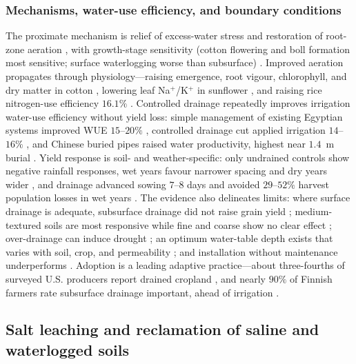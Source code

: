\subsubsection{Mechanisms, water-use efficiency, and boundary conditions}

The proximate mechanism is relief of excess-water stress and restoration of
root-zone aeration \parencite{BENNETT1982,DarziNaftchali2014}, with growth-stage
sensitivity (cotton flowering and boll formation most sensitive; surface
waterlogging worse than subsurface) \parencite{Qian2021}. Improved aeration
propagates through physiology---raising emergence, root vigour, chlorophyll, and
dry matter in cotton \parencite{Yang2022}, lowering leaf Na$^+$/K$^+$ in
sunflower \parencite{Islam2022}, and raising rice nitrogen-use efficiency
$16.1\%$ \parencite{DarziNaftchali2022b}. Controlled drainage repeatedly
improves irrigation water-use efficiency without yield loss: simple management
of existing Egyptian systems improved WUE $15$--$20\%$ \parencite{Wahba2005},
controlled drainage cut applied irrigation $14$--$16\%$ \parencite{Mahmoud2021},
and Chinese buried pipes raised water productivity, highest near $1.4$~m burial
\parencite{Liu2025}. Yield response is soil- and weather-specific: only
undrained controls show negative rainfall responses, wet years favour narrower
spacing and dry years wider \parencite{Rui2024,Kladivko2005,Acharya2019}, and
drainage advanced sowing $7$--$8$ days and avoided $29$--$52\%$ harvest
population losses in wet years \parencite{Mourtzinis2021,Nelson2011}. The
evidence also delineates limits: where surface drainage is adequate, subsurface
drainage did not raise grain yield \parencite{Wiersma2010}; medium-textured
soils are most responsive while fine and coarse show no clear effect
\parencite{Singh2022b}; over-drainage can induce drought
\parencite{Cordeiro2015,DeBoer2006}; an optimum water-table depth exists that
varies with soil, crop, and permeability \parencite{HOOGHOUDT1952,Bigelow2001};
and installation without maintenance underperforms \parencite{Malota2016}.
Adoption is a leading adaptive practice---about three-fourths of surveyed U.S.
producers report drained cropland \parencite{Morton2015}, and nearly $90\%$ of
Finnish farmers rate subsurface drainage important, ahead of irrigation
\parencite{PeltonenSainio2021}.

\subsection{Salt leaching and reclamation of saline and waterlogged soils}

